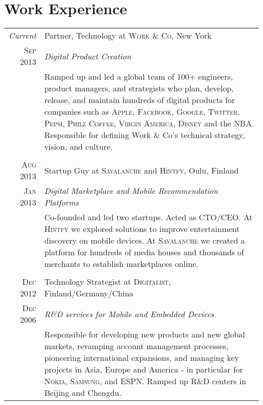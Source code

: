 \documentclass[a4paper,10pt]{article}
\begin{document}
\section{Work Experience}
\begin{tabular}{r|p{11cm}}
  \emph{Current} & Partner, Technology at \textsc{Work \& Co}, New York \\

  \textsc{Sep 2013} & \emph{Digital Product Creation}\\

  &\footnotesize{Ramped up and led a global team of 100+ engineers, product
    managers, and strategists who plan, develop, release, and maintain hundreds
    of digital products for companies such as \textsc{Apple}, \textsc{Facebook},
    \textsc{Google}, \textsc{Twitter}, \textsc{Pepsi}, \textsc{Philz Coffee},
    \textsc{Virgin America}, \textsc{Disney} and the \textsc{NBA}. Responsible
    for defining Work \& Co's technical strategy, vision, and culture.}\\

  \multicolumn{2}{c}{}\\

  \textsc{Aug 2013} & Startup Guy at \textsc{Savalanche} and \textsc{Hintfy}, Oulu, Finland \\

  \textsc{Jan 2013} & \emph{Digital Marketplace and Mobile Recommendation Platforms} \\

  &\footnotesize{Co-founded and led two startups. Acted as \textsc{CTO/CEO}. At
    \textsc{Hintfy} we explored solutions to improve entertainment discovery on
    mobile devices. At \textsc{Savalanche} we created a platform for hundreds of
    media houses and thousands of merchants to establish marketplaces online.}\\

  \multicolumn{2}{c}{}\\

  \textsc{Dec 2012} & Technology Strategist at \textsc{Digitalist},
  Finland/Germany/China \\

  \textsc{Dec 2006} & \emph{R\&D services for Mobile and Embedded Devices} \\

  &\footnotesize{Responsible for developing new products and new global markets,
    revamping account management processes, pioneering international expansions,
    and managing key projects in Asia, Europe and America - in particular for
    \textsc{Nokia}, \textsc{Samsung}, and \textsc{ESPN}. Ramped up R\&D centers
    in Beijing and Chengdu.}\\


\end{tabular}
\end{document}
